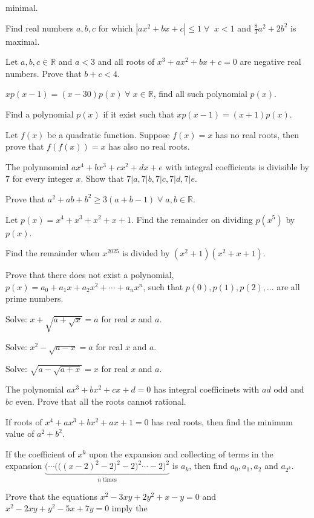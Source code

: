   minimal.
\item Find real numbers $a, b, c$ for which $|ax^2 + bx + c|\leq 1\;\forall\;\;x < 1$ and $\frac{8}{3}a^2 +
  2b^2$ is maximal.
\item Let $a, b, c\in\mathbb{R}$ and $a < 3$ and all roots of $x^3 + ax^2 + bx + c = 0$ are negative real
  numbers. Prove that $b + c < 4$.
\item $xp(x - 1) = (x - 30)p(x)\;\forall\;x\in\mathbb{R}$, find all such polynomial $p(x)$.
\item Find a polynomial $p(x)$ if it exist such that $xp(x - 1) = (x + 1)p(x)$.
\item Let $f(x)$ be a quadratic function. Suppose $f(x) = x$ has no real roots, then prove that $f(f(x)) =
  x$ has also no real roots.
\item The polynnomial $ax^4 + bx^3 + cx^2 + dx + e$ with integral coefficients is divisible by $7$ for every
  integer $x$. Show that $7|a, 7|b, 7|c, 7|d, 7|e$.
\item Prove that $a^2 + ab + b^2 \geq 3(a + b - 1)\;\forall\;a,b\in\mathbb{R}$.
\item Let $p(x) = x^4 + x^3 + x^2 + x + 1$. Find the remainder on dividing $p(x^5)$ by $p(x)$.
\item Find the remainder when $x^{2025}$ is divided by $(x^2 + 1)(x^2 + x + 1)$.
\item Prove that there does not exist a polynomial, $p(x) = a_0 + a_1x + a_2x^2 + \cdots + a_nx^n$, such
  that $p(0), p(1), p(2), \ldots$ are all prime numbers.
\item Solve: $x + \sqrt{a + \sqrt{x}} = a$ for real $x$ and $a$.
\item Solve: $x^2 - \sqrt{a - x} = a$ for real $x$ and $a$.
\item Solve: $\sqrt{a - \sqrt{a + x}} = x$ for real $x$ and $a$.
\item The polynomial $ax^3 + bx^2 + cx + d = 0$ has integral coefficinets with $ad$ odd and $bc$ even. Prove
  that all the roots cannot rational.
\item If roots of $x^4 + ax^3 + bx^2 + ax + 1 = 0$ has real roots, then find the minimum value of $a^2 +
  b^2$.
\item If the coefficient of $x^k$ upon the expansion and collecting of terms in the expansion
  $\underbrace{\bigg(\cdots\Big(\big((x - 2)^2 - 2\big)^2-2\Big)^2\cdots-2\bigg)^2}_{n\;\mathrm{times}}$ is
  $a_k$, then find $a_0, a_1, a_2$ and $a_{2^k}$.
\item Prove that the equations $x^2 - 3xy + 2y^2 + x - y = 0$ and $x^2 - 2xy + y^2 - 5x + 7y = 0$ imply the
